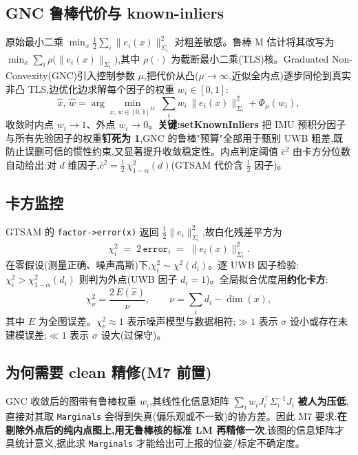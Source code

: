 \documentclass[11pt,a4paper]{report}
\begin{document}
\subsection{GNC 鲁棒代价与 known-inliers}
原始最小二乘 $\min_x \tfrac12\sum_i \|e_i(x)\|^2_{\Sigma_i}$ 对粗差敏感。鲁棒 M 估计将其改写为 $\min_x \sum_i \rho\!\big(\|e_i(x)\|_{\Sigma_i}\big)$,其中 $\rho(\cdot)$ 为截断最小二乘(TLS)核。Graduated Non-Convexity(GNC)引入控制参数 $\mu$,把代价从凸($\mu\!\to\!\infty$,近似全内点)逐步同伦到真实非凸 TLS,边优化边求解每个因子的权重 $w_i\in[0,1]$:
\begin{equation}
\hat{x},\,\hat{w} = \arg\min_{x,\,w\in[0,1]^M}\;
\sum_i w_i\,\|e_i(x)\|^2_{\Sigma_i} + \Phi_\mu(w_i),
\end{equation}
收敛时内点 $w_i\!\to\!1$、外点 $w_i\!\to\!0$。\textbf{关键:setKnownInliers} 把 IMU 预积分因子与所有先验因子的权重\textbf{钉死为 1},GNC 的鲁棒"预算"全部用于甄别 UWB 粗差,既防止误删可信的惯性约束,又显著提升收敛稳定性。内点判定阈值 $\bar{c}^2$ 由卡方分位数自动给出:对 $d$ 维因子,$\bar{c}^2 = \tfrac12\,\chi^2_{1-\alpha}(d)$(GTSAM 代价含 $\tfrac12$ 因子)。

\subsection{卡方监控}
GTSAM 的 \texttt{factor->error(x)} 返回 $\tfrac12\|e_i\|^2_{\Sigma_i}$,故白化残差平方为
\begin{equation}
\chi^2_i \;=\; 2\,\texttt{error}_i \;=\; \|e_i(x)\|^2_{\Sigma_i}.
\end{equation}
在零假设(测量正确、噪声高斯)下,$\chi^2_i\sim\chi^2(d_i)$。逐 UWB 因子检验:$\chi^2_i > \chi^2_{1-\alpha}(d_i)$ 则判为外点(UWB 因子 $d_i=1$)。全局拟合优度用\textbf{约化卡方}:
\begin{equation}
\chi^2_\nu = \frac{2\,E(\hat{x})}{\nu},\qquad
\nu = \sum_i d_i - \dim(x),
\end{equation}
其中 $E$ 为全图误差。$\chi^2_\nu\!\approx\!1$ 表示噪声模型与数据相符;$\gg 1$ 表示 $\sigma$ 设小或存在未建模误差;$\ll 1$ 表示 $\sigma$ 设大(过保守)。

\subsection{为何需要 clean 精修(M7 前置)}
GNC 收敛后的图带有鲁棒权重 $w_i$,其线性化信息矩阵 $\sum_i w_i J_i^\top\Sigma_i^{-1}J_i$ \textbf{被人为压低},直接对其取 \texttt{Marginals} 会得到失真(偏乐观或不一致)的协方差。因此 M7 要求:\textbf{在剔除外点后的纯内点图上,用无鲁棒核的标准 LM 再精修一次},该图的信息矩阵才具统计意义,据此求 \texttt{Marginals} 才能给出可上报的位姿/标定不确定度。
\end{document}
